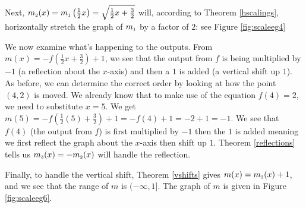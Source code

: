 {\begin{enumerate}

Next, $m_{\mbox{\tiny$2$}}(x) = m_{\mbox{\tiny$1$}}\left(\frac{1}{2} x\right) = \sqrt{\frac{1}{2} x + \frac{3}{2}}$ will, according to Theorem \ref{hscalings}, horizontally stretch the graph of $m_{\mbox{\tiny$1$}}$ by a factor of $2$: see Figure \ref{fig:scaleeg4}


We now examine what's happening to the outputs.  From $m(x) = - f\left(\frac{1}{2} x + \frac{3}{2}\right) + 1$, we see that the output from $f$ is being multiplied by $-1$ (a reflection about the $x$-axis) and then a $1$ is added (a vertical shift up $1$).  As before, we can determine the correct order by looking at how the point $(4,2)$ is moved. We already know that to make use of the equation $f(4)=2$,  we need to substitute $x=5$.  We get  $m(5) = - f\left(\frac{1}{2} (5) + \frac{3}{2}\right) + 1= - f(4)+1 = -2+1 = -1$.  We see that $f(4)$ (the output from $f$) is first multiplied by $-1$ then the $1$ is added meaning we first reflect the graph about the $x$-axis then shift up $1$.  Theorem \ref{reflections} tells us $m_{\mbox{\tiny$3$}}(x) = - m_{\mbox{\tiny$2$}}(x)$ will handle the reflection.


Finally, to handle the vertical shift, Theorem \ref{vshifts} gives $m(x) = m_{\mbox{\tiny$3$}}(x) +1$, and we see that the range of $m$ is $(-\infty,1]$. The graph of $m$ is given in Figure \ref{fig:scaleeg6}.


\end{enumerate}
}

\bigskip

